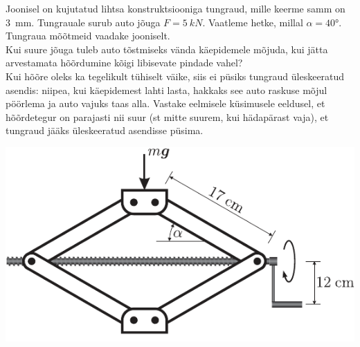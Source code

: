 \documentclass[10pt, twoside]{article}
\begin{document}
{%

Joonisel on kujutatud lihtsa konstruktsiooniga tungraud,
mille keerme samm on \SI{3}{mm}. Tungrauale surub auto jõuga $F = \SI{5}{kN}$. Vaatleme hetke, millal $\alpha = \ang{40}$. Tungraua mõõtmeid vaadake jooniselt.\\
\osa Kui suure jõuga tuleb auto tõstmiseks vända käepidemele mõjuda, kui jätta
arvestamata hõõrdumine kõigi libisevate pindade vahel?\\
\osa Kui hõõre oleks ka tegelikult tühiselt väike, siis ei püsiks tungraud üleskeeratud asendis: niipea, kui käepidemest lahti lasta, hakkaks see auto raskuse
mõjul pöörlema ja auto vajuks taas alla. Vastake eelmisele küsimusele eeldusel,
et hõõrdetegur on parajasti nii suur (st mitte suurem, kui hädapärast vaja),
et tungraud jääks üleskeeratud asendisse püsima.

\begin{center}
	\includegraphics[scale=0.9]{2011-v3g-10-tungraud}
\end{center}
\probend
\newpage

\bigskip


}
\end{document}
